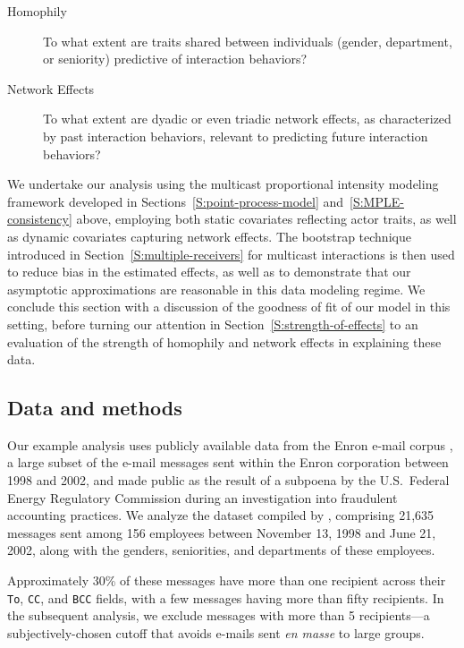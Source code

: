 \documentclass[final]{statsoc}
\begin{document}
\begin{description}
    \item[Homophily] To what extent are traits shared between individuals (gender, department, or seniority) predictive of interaction behaviors?

    \item[Network Effects] To what extent are dyadic or even triadic network effects, as characterized by past interaction behaviors, relevant to predicting future interaction behaviors?
\end{description}

We undertake our analysis using the multicast proportional intensity modeling framework developed in Sections~\ref{S:point-process-model} and~\ref{S:MPLE-consistency} above, employing both static covariates reflecting actor traits, as well as dynamic covariates capturing network effects.  The bootstrap technique introduced in Section~\ref{S:multiple-receivers} for multicast interactions is then used to reduce bias in the estimated effects, as well as to demonstrate that our asymptotic approximations are reasonable in this data modeling regime.  We conclude this section with a discussion of the goodness of fit of our model in this setting, before turning our attention in Section~\ref{S:strength-of-effects} to an evaluation of the strength of homophily and network effects in explaining these data.

\subsection{Data and methods}

\newcommand{\refTemployeesummary}{1} %
Our example analysis uses publicly available data from the Enron e-mail
corpus \citep{cohen2009enron}, a large subset of the e-mail messages sent
within the Enron corporation between 1998 and 2002, and made
public as the result of a subpoena by the U.S.~Federal Energy Regulatory
Commission during an investigation into fraudulent accounting practices.
We analyze the dataset compiled by \citet{zhou2007strategies}, comprising
21,635 messages sent among 156 employees between November 13, 1998 and
June 21, 2002, along with the genders, seniorities, and departments of
these employees.

Approximately 30\% of these messages have more than one recipient across
their \texttt{To}, \texttt{CC}, and \texttt{BCC} fields, with a few
messages having more than fifty recipients.
In the subsequent analysis, we exclude messages with more than 5
recipients---a subjectively-chosen cutoff that avoids e-mails sent
\emph{en masse} to large groups.
\end{document}
